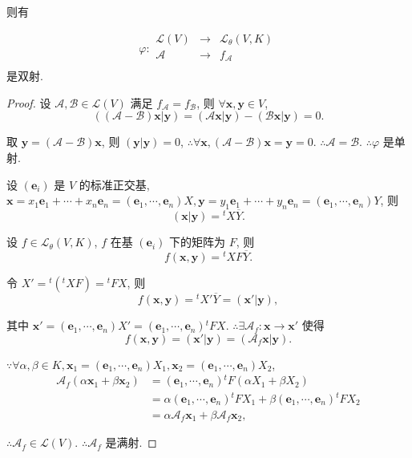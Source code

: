 \documentclass[color=black,device=normal,lang=cn,mode=geye]{elegantnote}
\begin{document}
则有
\begin{theorem}\label{t3.1}
    \[\varphi:\begin{array}{rcl}
        \mathcal{L}(V) & \to & \mathcal{L}_\theta(V,K) \\
        \mathcal{A} & \to & f_\mathcal{A} \\
    \end{array}\]
    是双射.
\end{theorem}
\begin{proof}
    设 $\mathcal{A},\mathcal{B}\in\mathcal{L}(V)$ 满足 $f_\mathcal{A}=f_\mathcal{B}$, 则 $\forall\boldsymbol{x},\boldsymbol{y}\in V$,
    \[((\mathcal{A}-\mathcal{B})\boldsymbol{x}|\boldsymbol{y})=(\mathcal{A}\boldsymbol{x}|\boldsymbol{y})-(\mathcal{B}\boldsymbol{x}|\boldsymbol{y})=0.\]

    取 $\boldsymbol{y}=(\mathcal{A}-\mathcal{B})\boldsymbol{x}$, 则 $(\boldsymbol{y}|\boldsymbol{y})=0$, $\therefore\forall\boldsymbol{x},(\mathcal{A}-\mathcal{B})\boldsymbol{x}=\boldsymbol{y}=0$. $\therefore\mathcal{A}=\mathcal{B}$. $\therefore\varphi$ 是单射.

    设 $(\boldsymbol{e}_i)$ 是 $V$ 的标准正交基, $\boldsymbol{x}=x_1\boldsymbol{e}_1+\cdots+x_n\boldsymbol{e}_n=(\boldsymbol{e}_1,\cdots,\boldsymbol{e}_n)X,\boldsymbol{y}=y_1\boldsymbol{e}_1+\cdots+y_n\boldsymbol{e}_n=(\boldsymbol{e}_1,\cdots,\boldsymbol{e}_n)Y$, 则
    \[(\boldsymbol{x}|\boldsymbol{y})={}^tX\overline{Y}.\]

    设 $f\in\mathcal{L}_\theta(V,K)$, $f$ 在基 $(\boldsymbol{e}_i)$ 下的矩阵为 $F$, 则
    \begin{equation}\label{eq3.1}
        f(\boldsymbol{x},\boldsymbol{y})={}^tXF\overline{Y}.
    \end{equation}

    令 $X'={}^t({}^tXF)={}^tFX$, 则
    \[f(\boldsymbol{x},\boldsymbol{y})={}^tX'\overline{Y}=(\boldsymbol{x}'|\boldsymbol{y}),\]

    其中 $\boldsymbol{x}'=(\boldsymbol{e}_1,\cdots,\boldsymbol{e}_n)X'=(\boldsymbol{e}_1,\cdots,\boldsymbol{e}_n){}^tFX$. $\therefore\exists\mathcal{A}_f:\boldsymbol{x}\to\boldsymbol{x}'$ 使得
    \begin{equation}\label{eq3.2}
        f(\boldsymbol{x},\boldsymbol{y})=(\boldsymbol{x}'|\boldsymbol{y})=(\mathcal{A}_f\boldsymbol{x}|\boldsymbol{y}).
    \end{equation}

    $\because\forall\alpha,\beta\in K,\boldsymbol{x}_1=(\boldsymbol{e}_1,\cdots,\boldsymbol{e}_n)X_1,\boldsymbol{x}_2=(\boldsymbol{e}_1,\cdots,\boldsymbol{e}_n)X_2$,
    \begin{align*}
        \mathcal{A}_f(\alpha\boldsymbol{x}_1+\beta\boldsymbol{x}_2) & =(\boldsymbol{e}_1,\cdots,\boldsymbol{e}_n){}^tF(\alpha X_1+\beta X_2) \\
        & =\alpha(\boldsymbol{e}_1,\cdots,\boldsymbol{e}_n){}^tFX_1+\beta(\boldsymbol{e}_1,\cdots,\boldsymbol{e}_n){}^tFX_2 \\
        & =\alpha\mathcal{A}_f\boldsymbol{x}_1+\beta\mathcal{A}_f\boldsymbol{x}_2,
    \end{align*}

    $\therefore\mathcal{A}_f\in\mathcal{L}(V)$. $\therefore\mathcal{A}_f$ 是满射.
\end{proof}
\end{document}
